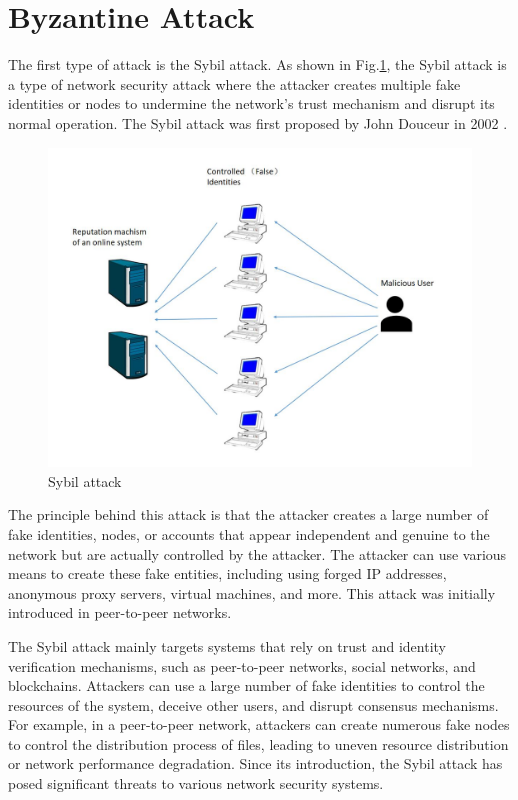 \documentclass[conference]{IEEEtran}
\begin{document}
\section{Byzantine Attack}
The first type of attack is the Sybil attack.  As shown in Fig.\ref{fig12}, the Sybil attack is a type of network security attack where the attacker creates
multiple fake identities or nodes to undermine the network's trust mechanism and disrupt its normal operation.
The Sybil attack was first proposed by John Douceur in 2002 \cite{b110}.

\begin{figure}[htbp]
    \centerline{\includegraphics[width=0.8\linewidth,height=0.6\linewidth]{picture/sybil.jpg}}
    \caption{Sybil attack}
    \label{fig12}
\end{figure}

The principle behind this attack is that the attacker creates a large number of fake identities, nodes,
or accounts that appear independent and genuine to the network but are actually controlled by the attacker.
The attacker can use various means to create these fake entities, including using forged IP addresses, anonymous proxy servers, virtual machines, and more.
This attack was initially introduced in peer-to-peer networks.

The Sybil attack mainly targets systems that rely on trust and identity verification mechanisms, such as peer-to-peer networks, social networks, and blockchains. Attackers can use a large number of fake identities to control the resources of the system, deceive other users, and disrupt consensus mechanisms. For example, in a peer-to-peer network, attackers can create numerous fake nodes to control the distribution process of files, leading to uneven resource distribution or network performance degradation.
Since its introduction, the Sybil attack has posed significant threats to various network security systems.
\end{document}
